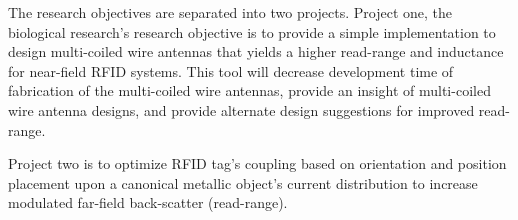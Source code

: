 The research objectives are separated into two projects. Project one, the biological research's research objective is to provide a simple implementation to design multi-coiled wire antennas that yields a higher read-range and inductance for near-field RFID systems. This tool will decrease development time of fabrication of the multi-coiled wire antennas, provide an insight of multi-coiled wire antenna designs, and provide alternate design suggestions for improved read-range.  

Project two is to optimize RFID tag's coupling based on orientation and position placement upon a canonical metallic object's current distribution to increase modulated far-field back-scatter (read-range). %

